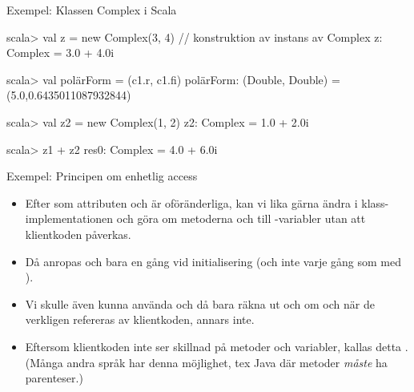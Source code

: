 \begin{Slide}{Exempel: Klassen Complex i Scala}\SlideFontSmall
{}
\begin{REPL}
scala> val z = new Complex(3, 4)  // konstruktion av instans av Complex
z: Complex = 3.0 + 4.0i

scala> val polärForm = (c1.r, c1.fi)
polärForm: (Double, Double) = (5.0,0.6435011087932844)

scala> val z2 = new Complex(1, 2)
z2: Complex = 1.0 + 2.0i

scala> z1 + z2
res0: Complex = 4.0 + 6.0i
\end{REPL}
\end{Slide}



\begin{Slide}{Exempel: Principen om enhetlig access}\SlideFontSmall
{}
\pause
\begin{itemize}
\item Efter som attributen  och  är oföränderliga, kan vi lika gärna ändra i klass-implementationen och göra om metoderna  och  till -variabler utan att klientkoden påverkas.

\item Då anropas  och  bara en gång vid initialisering (och inte varje gång som med ).

\item Vi skulle även kunna använda  och då bara räkna ut  och  om och när de verkligen refereras av klientkoden, annars inte.

\item Eftersom klientkoden inte ser skillnad på metoder och variabler, kallas detta . (Många andra språk har  denna möjlighet, tex Java där metoder \emph{måste} ha parenteser.)
\end{itemize}
\end{Slide}




